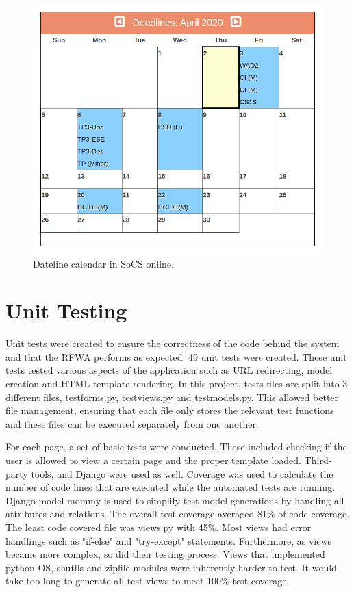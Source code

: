 \documentclass{l4proj}
\begin{document}
\begin{figure}[h]
    \centering
    \includegraphics[scale=0.53]{images/calendar-socs.png}
    \caption{Dateline calendar in SoCS online.}
\end{figure}

\section{Unit Testing}

Unit tests were created to ensure the correctness of the code behind the system and that the
RFWA performs as expected. 49 unit tests were created. These unit tests tested various aspects of the application such as URL redirecting, model creation and HTML template rendering. In this project, tests files are split into 3 different files, test\textunderscore forms.py, test\textunderscore views.py and test\textunderscore models.py. This allowed better file management, ensuring that each file only stores the relevant test functions and these files can be executed separately from one another.  

For each page, a set of basic tests were conducted. These included checking if the user is allowed to view a certain page and the proper template loaded. Third-party tools, \cite{Coverage} and Django \cite{Modelmommy} were used as well. Coverage was used to calculate the number of code lines that are executed while the automated tests are running. Django model mommy is used to simplify test model generations by handling all attributes and relations. The overall test coverage averaged 81\% of code coverage. The least code covered file was views.py with 45\%. Most views had error handlings such as "if-else" and "try-except" statements. Furthermore, as views became more complex, so did their testing process. Views that implemented python OS, shutils and zipfile modules were inherently harder to test. It would take too long to generate all test views to meet 100\% test coverage.
\end{document}
